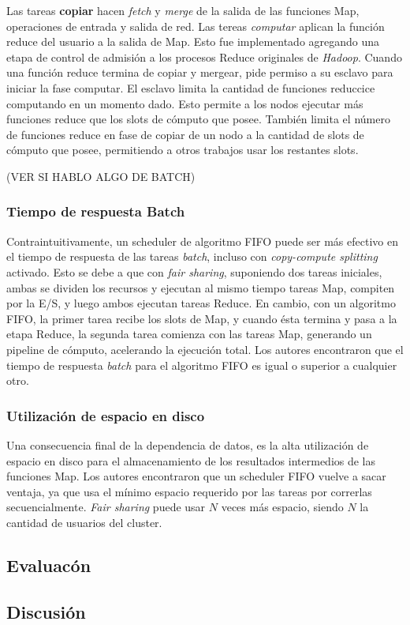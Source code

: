 \vspace{2mm} 

Las tareas \textbf{copiar} hacen \emph{fetch} y \emph{merge} de la salida de las funciones Map, operaciones de entrada y salida de red. Las tereas \emph{computar} aplican la funci\'on reduce del usuario a la salida de Map. Esto fue implementado agregando una etapa de control de admisi\'on a los procesos Reduce originales de \emph{Hadoop}. Cuando una funci\'on reduce termina de copiar y mergear, pide permiso a su esclavo para iniciar la fase computar. El esclavo limita la cantidad de funciones reduccice computando en un momento dado. Esto permite a los nodos ejecutar m\'as funciones reduce que los slots de c\'omputo que posee. Tambi\'en limita el n\'umero de funciones reduce en fase de copiar de un nodo a la cantidad de slots de c\'omputo que posee, permitiendo a otros trabajos usar los restantes slots.

(VER SI HABLO ALGO DE BATCH)

\vspace{2mm} 

\subsubsection{Tiempo de respuesta Batch}

Contraintuitivamente, un scheduler de algoritmo FIFO puede ser m\'as efectivo en el tiempo de respuesta de las tareas \emph{batch}, incluso con \emph{copy-compute splitting} activado. Esto se debe a que con \emph{fair sharing}, suponiendo dos tareas iniciales, ambas se dividen los recursos y ejecutan al mismo tiempo tareas Map, compiten por la E/S, y luego ambos ejecutan tareas Reduce. En cambio, con un algoritmo FIFO, la primer tarea recibe los slots de Map, y cuando \'esta termina y pasa a la etapa Reduce, la segunda tarea comienza con las tareas Map, generando un pipeline de c\'omputo, acelerando la ejecuci\'on total. Los autores encontraron que el tiempo de respuesta \emph{batch} para el algoritmo FIFO es igual o superior a cualquier otro.

\subsubsection{Utilizaci\'on de espacio en disco}

Una consecuencia final de la dependencia de datos, es la alta utilizaci\'on de espacio en disco para el almacenamiento de los resultados intermedios de las funciones Map. Los autores encontraron que un scheduler FIFO vuelve a sacar ventaja, ya que usa el m\'inimo espacio requerido por las tareas por correrlas secuencialmente. \emph{Fair sharing} puede usar $N$ veces m\'as espacio, siendo $N$ la cantidad de usuarios del cluster.

\subsection{Evaluac\'on}

\subsection{Discusi\'on}
